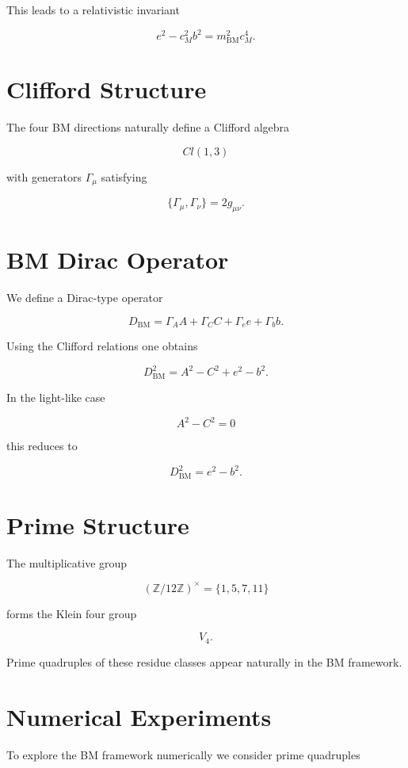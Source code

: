 \documentclass[11pt,a4paper]{article}
\begin{document}
	This leads to a relativistic invariant
	
	\[
	e^2 - c_M^2 b^2
	=
	m_{\mathrm{BM}}^2 c_M^4 .
	\]
	
	\section{Clifford Structure}
	
	The four BM directions naturally define a Clifford algebra
	
	\[
	Cl(1,3)
	\]
	
	with generators $\Gamma_\mu$ satisfying
	
	\[
	\{\Gamma_\mu,\Gamma_\nu\}=2g_{\mu\nu}.
	\]
	
	\section{BM Dirac Operator}
	
	We define a Dirac-type operator
	
	\[
	D_{\mathrm{BM}}
	=
	\Gamma_A A
	+
	\Gamma_C C
	+
	\Gamma_e e
	+
	\Gamma_b b .
	\]
	
	Using the Clifford relations one obtains
	
	\[
	D_{\mathrm{BM}}^2
	=
	A^2 - C^2 + e^2 - b^2 .
	\]
	
	In the light-like case
	
	\[
	A^2-C^2=0
	\]
	
	this reduces to
	
	\[
	D_{\mathrm{BM}}^2
	=
	e^2-b^2 .
	\]
	
	\section{Prime Structure}
	
	The multiplicative group
	
	\[
	(\mathbb Z/12\mathbb Z)^\times
	=
	\{1,5,7,11\}
	\]
	
	forms the Klein four group
	
	\[
	V_4 .
	\]
	
	Prime quadruples of these residue classes appear naturally
	in the BM framework.
	
	\section{Numerical Experiments}
	
	To explore the BM framework numerically we consider
	prime quadruples
	
\end{document}
